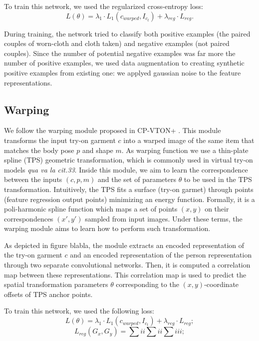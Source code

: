 To train this network, we used the regularized cross-entropy loss:
\begin{equation}
L(\theta) = \lambda_1 \cdot L_1(c_{warped}, I_{c_t}) + \lambda_{reg} \cdot L_{reg} .
\end{equation}

During training, the network tried to classify both positive examples (the paired couples of worn-cloth and cloth taken) and negative examples (not paired couples). Since the number of potential negative examples was far more the number of positive examples, we used data augmentation to creating synthetic positive examples from existing one: we applyed gaussian noise to the feature representations.


\subsection{Warping}
We follow the warping module proposed in CP-VTON+ \cite{CP-VTON+}.
This module transforms the input try-on garment $c$ into a warped image of the same item that matches the body pose $p$ and shape $m$. As warping function we use a thin-plate spline (TPS) geometric transformation, which is commonly used in virtual
try-on models \textit{qua va la cit.33}.  Inside this module, we aim to learn the correspondence between the inputs $(c, p, m)$ and the set of parameters $\theta$ to be used in the TPS transformation. Intuitively, the TPS fits a surface (try-on garmet) through points (feature regression output points) minimizing an energy function. Formally, it is a poli-harmonic spline function which maps a set of points $(x,y)$ on their correspondences $(x',y')$ sampled from input images. Under these terms, the warping module aims to learn how to perform such transformation.

As depicted in figure blabla, the module extracts an encoded representation of the try-on garment $c$ and an encoded representation of the person representation through two separate convolutional networks.
Then, it is computed a correlation map between these representations.
This correlation map is used to predict the spatial transformation parameters $\theta$ corresponding to the $(x,y)$-coordinate offsets of TPS anchor points. 

To train this network, we used the following loss:
\begin{equation}
L(\theta) = \lambda_1 \cdot L_1(c_{warped}, I_{c_t}) + \lambda_{reg} \cdot L_{reg} ;
\end{equation} 
\begin{equation}
L_{reg}(G_x, G_y) = \sum{i}{i}\sum{i}{i}\sum{i}{i}i ;
\end{equation}

